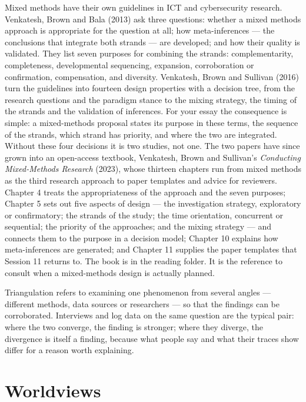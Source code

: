 \documentclass[11pt,a4paper,british,twoside=false,headings=small,chapterprefix=false,numbers=noenddot]{scrbook}
\newenvironment{block}[1]{\begin{tcolorbox}[scriptbox, title={#1}]}{\end{tcolorbox}}
\begin{document}
Mixed methods have their own guidelines in ICT and cybersecurity research. Venkatesh, Brown and Bala (2013) ask three questions: whether a mixed methods approach is appropriate for the question at all; how meta-inferences --- the conclusions that integrate both strands --- are developed; and how their quality is validated. They list seven purposes for combining the strands: complementarity, completeness, developmental sequencing, expansion, corroboration or confirmation, compensation, and diversity. Venkatesh, Brown and Sullivan (2016) turn the guidelines into fourteen design properties with a decision tree, from the research questions and the paradigm stance to the mixing strategy, the timing of the strands and the validation of inferences. For your essay the consequence is simple: a mixed-methods proposal states its purpose in these terms, the sequence of the strands, which strand has priority, and where the two are integrated. Without these four decisions it is two studies, not one. The two papers have since grown into an open-access textbook, Venkatesh, Brown and Sullivan's \emph{Conducting Mixed-Methods Research} (2023), whose thirteen chapters run from mixed methods as the third research approach to paper templates and advice for reviewers. Chapter 4 treats the appropriateness of the approach and the seven purposes; Chapter 5 sets out five aspects of design --- the investigation strategy, exploratory or confirmatory; the strands of the study; the time orientation, concurrent or sequential; the priority of the approaches; and the mixing strategy --- and connects them to the purpose in a decision model; Chapter 10 explains how meta-inferences are generated; and Chapter 11 supplies the paper templates that Session 11 returns to. The book is in the reading folder. It is the reference to consult when a mixed-methods design is actually planned.

\begin{block}{Triangulation}
Triangulation refers to examining one phenomenon from several angles --- different methods, data sources or researchers --- so that the findings can be corroborated. Interviews and log data on the same question are the typical pair: where the two converge, the finding is stronger; where they diverge, the divergence is itself a finding, because what people say and what their traces show differ for a reason worth explaining.
\end{block}

\section{Worldviews}
\end{document}
